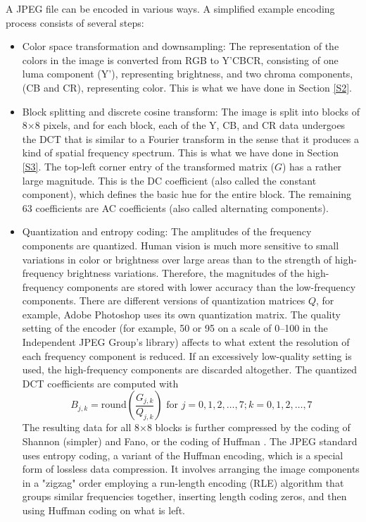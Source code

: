 \documentclass[a4paper,12pt,twoside]{article}
\begin{document}
A JPEG file can be encoded in various ways. A simplified example encoding process consists of several steps:
\begin{itemize}
    \item Color space transformation and downsampling: The representation of the colors in the image is converted from RGB to Y'CBCR, consisting of one luma component (Y'), representing brightness, and two chroma components, (CB and CR), representing color. This is what we have done in Section \ref{S2}.
    \item Block splitting and discrete cosine transform: The image is split into blocks of 8×8 pixels, and for each block, each of the Y, CB, and CR data undergoes the DCT that is similar to a Fourier transform in the sense that it produces a kind of spatial frequency spectrum. This is what we have done in Section \ref{S3}. The top-left corner entry of the transformed matrix ($G$) has a rather large magnitude. This is the DC coefficient (also called the constant component), which defines the basic hue for the entire block. The remaining 63 coefficients are AC coefficients (also called alternating components).
    \item Quantization and entropy coding: The amplitudes of the frequency components are quantized. Human vision is much more sensitive to small variations in color or brightness over large areas than to the strength of high-frequency brightness variations. Therefore, the magnitudes of the high-frequency components are stored with lower accuracy than the low-frequency components. There are different versions of quantization matrices $Q$, for example, Adobe Photoshop uses its own quantization matrix. The quality setting of the encoder (for example, 50 or 95 on a scale of 0–100 in the Independent JPEG Group's library) affects to what extent the resolution of each frequency component is reduced. If an excessively low-quality setting is used, the high-frequency components are discarded altogether. The quantized DCT coefficients are computed with
    \begin{equation}
        B_{j,k}=\mathrm {round} \left({\frac {G_{j,k}}{Q_{j,k}}}\right){\mbox{ for }}j=0,1,2,\ldots ,7;k=0,1,2,\ldots ,7
    \end{equation}
    The resulting data for all 8×8 blocks is further compressed by the coding of Shannon (simpler) and Fano, or the coding of Huffman \cite{wiki:jpegenc}. The JPEG standard uses entropy coding, a variant of the Huffman encoding, which is a special form of lossless data compression. It involves arranging the image components in a "zigzag" order employing a run-length encoding (RLE) algorithm that groups similar frequencies together, inserting length coding zeros, and then using Huffman coding on what is left.

\end{itemize}
\end{document}
